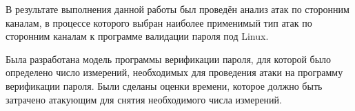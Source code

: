  \label{sec:summary}

В результате выполнения данной работы был проведён анализ атак по сторонним каналам, в процессе
которого выбран наиболее применимый тип атак
по сторонним каналам к программе валидации пароля под Linux.

Была разработана модель программы верификации пароля, для которой
было определено число измерений, необходимых для проведения атаки
на программу верификации пароля. Были сделаны оценки времени,
которое должно быть затрачено атакующим для снятия необходимого
числа измерений.

\clearpage
